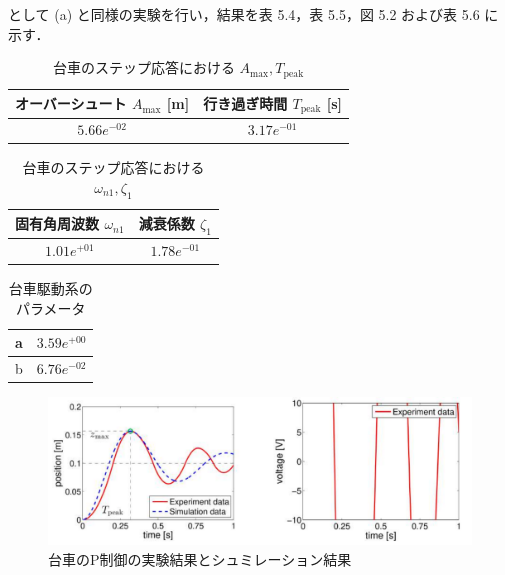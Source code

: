 として (a) と同様の実験を行い，結果を表 5.4，表 5.5，図 5.2 および表 5.6 に示す．

\begin{table}[h]
  \centering
  \caption{台車のステップ応答における \( A_{\text{max}}, T_{\text{peak}} \)}
  \label{tab:step_response_1}
  \begin{tabular}{|c|c|}
    \hline
    オーバーシュート \( A_{\text{max}} \) [m] & 行き過ぎ時間 \( T_{\text{peak}} \) [s] \\
    \hline
    \( 5.66e^{-02}\)                          & \( 3.17e^{-01}\)                       \\
    \hline
  \end{tabular}
\end{table}

\begin{table}[h]
  \centering
  \caption{台車のステップ応答における \( \omega_{n1}, \zeta_1 \)}
  \label{tab:step_response_2}
  \begin{tabular}{|c|c|}
    \hline
    固有角周波数 \( \omega_{n1} \) & 減衰係数 \( \zeta_1 \) \\
    \hline
    \(1.01e^{+01}\)                & \( 1.78e^{-01}\)       \\
    \hline
  \end{tabular}
\end{table}

\begin{table}[h]
  \centering
  \caption{台車駆動系のパラメータ}
  \label{tab:drive_system_parameters_2}
  \begin{tabular}{|c|c|}
    \hline
    a & \(3.59e^{+00}\)  \\
    \hline
    b & \( 6.76e^{-02}\) \\
    \hline
  \end{tabular}
\end{table}

\begin{figure}[h]
  \centering
  \includegraphics[scale=1]{sozai/52.pdf}
  \caption{台車のP制御の実験結果とシュミレーション結果}
\end{figure}

